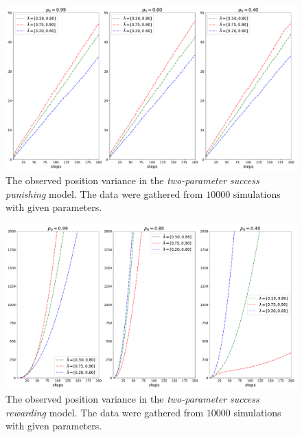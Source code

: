\documentclass[runningheads]{CMSIM}
\begin{document}
\begin{definition}
        \begin{figure}
            \includegraphics[width=1\textwidth]{../simulations/e_position_10000_walks_200_steps_type_success_punished_two_lambdas}\caption{\label{fig:var_s_t_2l_sp}The observed position variance in the \emph{two-parameter
            success punishing} model.
            The data were gathered from $10000$ simulations
            with given parameters.}

        \end{figure}

        \begin{figure}
            \includegraphics[width=1\textwidth]{../simulations/e_position_10000_walks_200_steps_type_success_rewarded_two_lambdas}

            \caption{\label{fig:var_s_t_2l_sr}The observed position variance in the \emph{two-parameter
            success rewarding} model.
            The data were gathered from $10000$ simulations
            with given parameters.}

        \end{figure}
    \end{definition}
\end{document}
